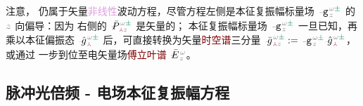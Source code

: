 注意， 仍属于矢量\textcolor{Plum}{非线性}波动方程，尽管方程左侧是\textcolor{PineGreen}{本征复振幅}标量场 $\Xint{\begin{smallmatrix} ~ \\ {}^{}_{\mathcolor{gray}{-}} \\ ~ \end{smallmatrix}}{09}{\mathtt{g}}^{\;\!\mathcolor{gray}{\omega} \textcolor{PineGreen}{\pm}}_{\;\! \mathcolor{gray}{z}}$ 的 $\mathcolor{gray}{z}$ 向偏导：因为 {\one} 右侧的 $\Xint{\mathcolor{gray}{-}}{25}{\bar{P}}^{\;\! \mathcolor{gray}{\omega} \textcolor{PineGreen}{\pm}}_{\;\! \textcolor{Maroon}{\Yup} \mathcolor{gray}{z}}$ 是矢量的；{\two} \textcolor{PineGreen}{本征复振幅}标量场 $\Xint{\begin{smallmatrix} ~ \\ {}^{}_{\mathcolor{gray}{-}} \\ ~ \end{smallmatrix}}{09}{\mathtt{g}}^{\;\!\mathcolor{gray}{\omega} \textcolor{PineGreen}{\pm}}_{\;\! \mathcolor{gray}{z}}$ 一旦已知，再乘以\textcolor{PineGreen}{本征偏振态} $\Xint{{}^{}_{\mathcolor{gray}{-}}}{10}{\hat{g}}^{\;\!\mathcolor{gray}{\omega} \textcolor{PineGreen}{\pm}}_{\;\! \textcolor{Maroon}{\Yup}}$ 后，可直接转换为矢量\textcolor{Maroon}{时空谱}三分量 $\Xint{{}^{}_{\mathcolor{gray}{-}}}{10}{\bar{g}}^{\;\!\mathcolor{gray}{\omega} \textcolor{PineGreen}{\pm}}_{\;\! \textcolor{Maroon}{\Yup} \mathcolor{gray}{z}} := \Xint{\begin{smallmatrix} ~ \\ {}^{}_{\mathcolor{gray}{-}} \\ ~ \end{smallmatrix}}{09}{\mathtt{g}}^{\;\!\mathcolor{gray}{\omega} \textcolor{PineGreen}{\pm}}_{\;\! \mathcolor{gray}{z}} \Xint{{}^{}_{\mathcolor{gray}{-}}}{10}{\hat{g}}^{\;\!\mathcolor{gray}{\omega} \textcolor{PineGreen}{\pm}}_{\;\! \textcolor{Maroon}{\Yup}}$，或通过  一步到位至电矢量场\textcolor{Maroon}{傅立叶谱} $\Xint{\mathcolor{gray}{-}}{25}{\bar{E}}^{\;\!\mathcolor{gray}{\omega}}_{\;\! \mathcolor{gray}{z}}$。

\subsection{脉冲光倍频 - 电场本征复振幅方程}\label{ssec:SHG_spectrum}

